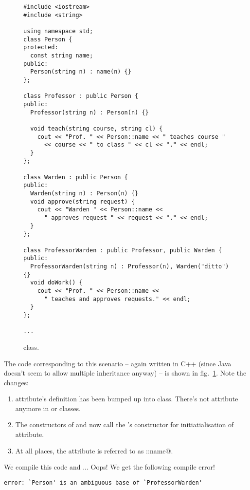 \documentclass[12pt,a4paper]{article}
\begin{document}
\begin{figure}[H]
\begin{lstlisting}[frame=single]
#include <iostream>
#include <string>

using namespace std;
class Person {
protected:
  const string name;
public:
  Person(string n) : name(n) {}
};

class Professor : public Person {
public:
  Professor(string n) : Person(n) {}
  
  void teach(string course, string cl) {
    cout << "Prof. " << Person::name << " teaches course " 
      << course << " to class " << cl << "." << endl;
  }
};

class Warden : public Person {
public:
  Warden(string n) : Person(n) {}
  void approve(string request) {
    cout << "Warden " << Person::name <<
      " approves request " << request << "." << endl;
  }
};

class ProfessorWarden : public Professor, public Warden {
public:
  ProfessorWarden(string n) : Professor(n), Warden("ditto") {}
  void doWork() {
    cout << "Prof. " << Person::name << 
      " teaches and approves requests." << endl;
  }
};

...
\end{lstlisting}
\caption{\lstinline@Warden@ class.}
\label{f:ins3}
\end{figure}

The code corresponding to this scenario -- again written in C++ (since Java doesn't seem to allow multiple inheritance anyway) -- is shown in fig.~\ref{f:ins3}. Note the changes:
\begin{enumerate}
	\item  \lstinline@name@ attribute's definition has been bumped up into \lstinline@Person@ class. There's not \lstinline@name@ attribute anymore in \lstinline@Professor@ or \lstinline@Warden@ classes.
	\item The constructors of \lstinline@Professor@ and \lstinline@Warden@ now call the \lstinline@Person@'s constructor for initiatialisation of \lstinline@name@ attribute.
	\item At all places, the \lstinline@name@ attribute is referred to as \lstinline@Person::name@.
\end{enumerate}

We compile this code and ... Oops! We get the following compile error!
\begin{lstlisting}[frame=single]
error: `Person' is an ambiguous base of `ProfessorWarden'
\end{lstlisting}
\end{document}
